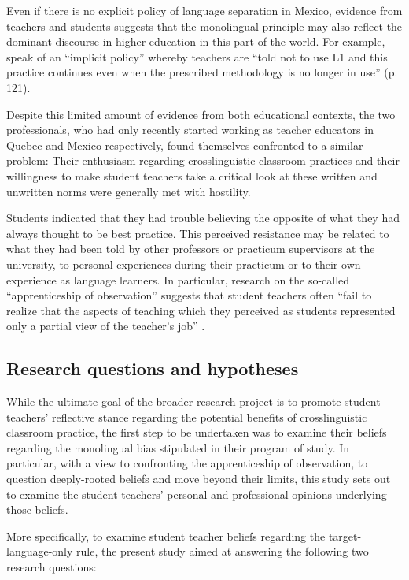 \documentclass[output=paper]{../langscibook}
\begin{document}
Even if there is no explicit policy of language separation in Mexico, evidence from teachers and students suggests that the monolingual principle may also reflect the dominant discourse in higher education in this part of the world. For example,  \citet{MoraPabloEtAl2011} speak of an “implicit policy” whereby teachers are “told not to use L1 and this practice continues even when the prescribed methodology is no longer in use” (p. 121).

Despite this limited amount of evidence from both educational contexts, the two professionals, who had only recently started working as teacher educators in Quebec and Mexico respectively, found themselves confronted to a similar problem: Their enthusiasm regarding crosslinguistic classroom practices and their willingness to make student teachers take a critical look at these written and unwritten norms were generally met with hostility. 

Students indicated that they had trouble believing the opposite of what they had always thought to be best practice. This perceived resistance may be related to what they had been told by other professors or practicum supervisors at the university, to personal experiences during their practicum or to their own experience as language learners. In particular, research on the so-called “apprenticeship of observation” \citep{Lortie1975} suggests that student teachers often “fail to realize that the aspects of teaching which they perceived as students represented only a partial view of the teacher’s job” \citep[274]{Borg2004}.

\subsection{Research questions and hypotheses}
While the ultimate goal of the broader research project is to promote student teachers’ reflective stance regarding the potential benefits of crosslinguistic classroom practice, the first step to be undertaken was to examine their beliefs regarding the monolingual bias stipulated in their program of study. In particular, with a view to confronting the apprenticeship of observation, to question deeply-rooted beliefs and move beyond their limits, this study sets out to examine the student teachers’ personal and professional opinions underlying those beliefs. 

More specifically, to examine student teacher beliefs regarding the target-lan\-guage-only rule, the present study aimed at answering the following two research questions: 
\end{document}
